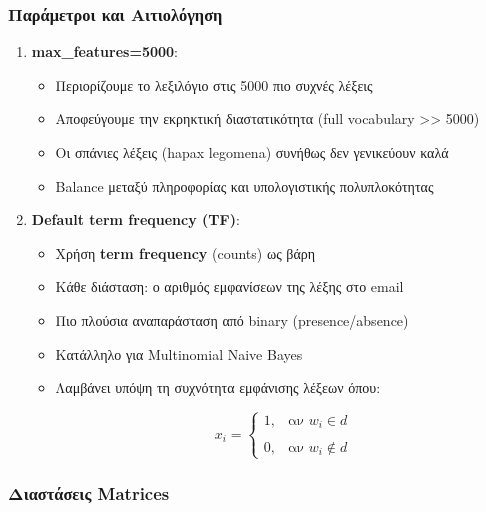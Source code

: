 \documentclass[12pt,a4paper,twoside]{book}
\begin{document}
\subsubsection*{Παράμετροι και Αιτιολόγηση}

\begin{enumerate}
    \item \textbf{max\_features=5000}:
          \begin{itemize}
              \item Περιορίζουμε το λεξιλόγιο στις 5000 πιο συχνές λέξεις
              \item Αποφεύγουμε την εκρηκτική διαστατικότητα (full vocabulary >> 5000)
              \item Οι σπάνιες λέξεις (hapax legomena) συνήθως δεν γενικεύουν καλά
              \item Balance μεταξύ πληροφορίας και υπολογιστικής πολυπλοκότητας
          \end{itemize}

    \item \textbf{Default term frequency (TF)}:
          \begin{itemize}
              \item Χρήση \textbf{term frequency} (counts) ως βάρη
              \item Κάθε διάσταση: ο αριθμός εμφανίσεων της λέξης στο email
              \item Πιο πλούσια αναπαράσταση από binary (presence/absence)
              \item Κατάλληλο για Multinomial Naive Bayes
              \item Λαμβάνει υπόψη τη συχνότητα εμφάνισης λέξεων
                    όπου:

                    \begin{equation}
                        x_i = \begin{cases}
                            1, & \text{αν } w_i \in d    \\\\
                            0, & \text{αν } w_i \notin d
                        \end{cases}
                    \end{equation}
          \end{itemize}
\end{enumerate}

\subsubsection*{Διαστάσεις Matrices}
\end{document}
